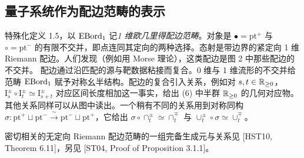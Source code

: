 \subsection{量子系统作为配边范畴的表示}
特殊化定义 1.5，以 $\operatorname{EBord}_1$ 记\emph{1 维欧几里得配边范畴}。对象是 $\bullet=\mathrm{pt}^{+}$ 与 $\circ=\mathrm{pt}^{-}$ 的有限不交并，即点连同其定向的两种选择。态射是带边界的紧定向 1 维 Riemann 配边。人们发现（例如用 Morse 理论），这类配边是图 2 中那些配边的不交并。
配边通过沿匹配的源与靶数据粘接而复合。0 维与 1 维流形的不交并给范畴 $\operatorname{EBord}_1$ 赋予对称幺半结构。配边的复合引入关系，例如对 $s,t\in\mathbb{R}_{\ge 0}$，$\mathrm{I}^{\pm}_s\circ\mathrm{I}^{\pm}_t\simeq\mathrm{I}^{\pm}_{s+t}$ 对应区间长度相加这一事实，给出 (6) 中半群 $\mathbb{R}_{\ge 0}$ 的几何对应物。其他关系同样可以从图中读出。一个稍有不同的关系用到对称同构 $\sigma\colon\mathrm{pt}^{+}\sqcup\mathrm{pt}^{-}\xrightarrow{\ \sim\ }\mathrm{pt}^{-}\sqcup\mathrm{pt}^{+}$，它给出 $\sigma\circ\cap^{\pm}_t\simeq\cap^{\mp}_t$ 与 $\cup^{\pm}_t\circ\sigma\simeq\cup^{\mp}_t$。


密切相关的无定向 Riemann 配边范畴的一组完备生成元与关系见 [HST10, Theorem 6.11]，另见 [ST04, Proof of Proposition 3.1.1]。

